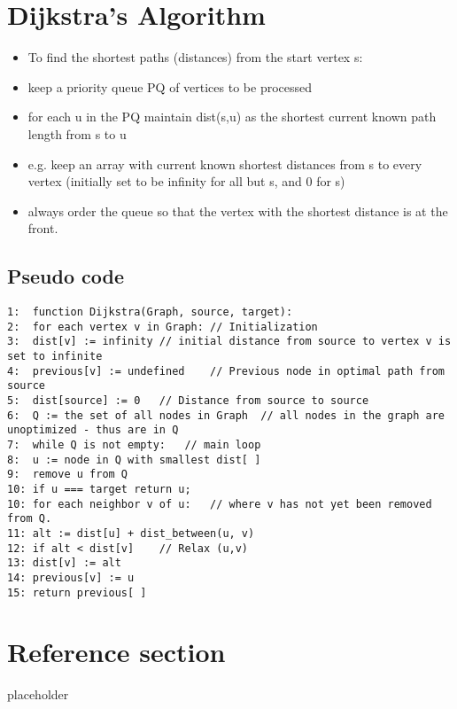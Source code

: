 \documentclass{article}
\begin{document}
\section{Dijkstra’s Algorithm}
\begin{itemize}
	\item To find the shortest paths (distances) from the start vertex s:
	\item keep a priority queue PQ of vertices to be processed
	\item for each u in the PQ maintain dist(s,u) as the shortest current known path length from s to u
	\item e.g. keep an array with current known shortest distances from s to every vertex (initially set to be infinity for all but s, and 0 for s)
	\item always order the queue so that the vertex with the shortest distance is at the front.
\end{itemize}

\subsection{Pseudo code}
\begin{lstlisting}
1:	function Dijkstra(Graph, source, target):
2:	for each vertex v in Graph:	// Initialization
3:	dist[v] := infinity	// initial distance from source to vertex v is set to infinite
4:	previous[v] := undefined	// Previous node in optimal path from source
5:	dist[source] := 0	// Distance from source to source
6:	Q := the set of all nodes in Graph	// all nodes in the graph are unoptimized - thus are in Q
7:	while Q is not empty:	// main loop
8:	u := node in Q with smallest dist[ ]
9:	remove u from Q
10: if u === target return u;
10:	for each neighbor v of u:	// where v has not yet been removed from Q.
11:	alt := dist[u] + dist_between(u, v)
12:	if alt < dist[v]	// Relax (u,v)
13:	dist[v] := alt
14:	previous[v] := u
15:	return previous[ ]

\end{lstlisting}

\pagebreak
\section*{Reference section} \label{sec:reference}
\begin{description}
	\item[placeholder] \hfill \\
\end{description}
\end{document}

